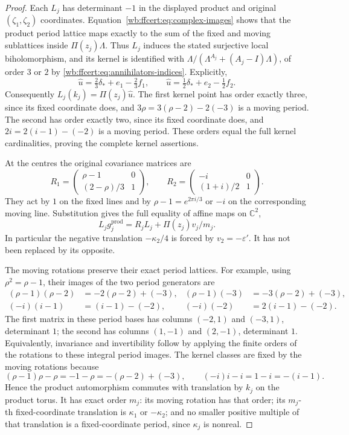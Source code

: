 \begin{proof}
Each $L_j$ has determinant $-1$ in the displayed product and original
$(\zeta_1,\zeta_2)$ coordinates. Equation~\eqref{wb:ffcert:eq:complex-images}
shows that the product period lattice maps exactly to the sum of the
fixed and moving sublattices inside $\Pi(z_j)\Lambda$.
Thus $L_j$ induces the stated surjective local biholomorphism, and its
kernel is identified with
$\Lambda/(\Lambda^{A_j}+(A_j-I)\Lambda)$, of order $3$ or $2$ by
\eqref{wb:ffcert:eq:annihilators-indices}. Explicitly,
\[
 \widehat u=\tfrac23\delta_*+e_1-\tfrac23f_1,
 \qquad
 \widehat u=\tfrac12\delta_*+e_2-\tfrac12f_2.
 \tag{FF17}\label{wb:ffcert:eq:kernel-lifts}
\]
Consequently $L_j(k_j)=\Pi(z_j)\widehat u$. The first kernel point
has order exactly three, since its fixed coordinate does, and
$3\rho=3(\rho-2)-2(-3)$ is a moving period. The second has order
exactly two, since its fixed coordinate does, and
$2i=2(i-1)-(-2)$ is a moving period. These orders equal the full kernel
cardinalities, proving the complete kernel assertions.

At the centres the original covariance matrices are
\[
 R_1=\begin{pmatrix}\rho-1&0\\(2-\rho)/3&1\end{pmatrix},\qquad
 R_2=\begin{pmatrix}-i&0\\(1+i)/2&1\end{pmatrix}.
 \tag{FF18}\label{wb:ffcert:eq:central-covariance}
\]
They act by $1$ on the fixed lines and by
$\rho-1=e^{2\pi i/3}$ or $-i$ on the corresponding moving line.
Substitution gives the full equality of affine maps on $\mathbb C^2$,
\[
 L_jg_j^{\mathrm{prod}}
   =R_jL_j+\Pi(z_j)v_j/m_j.
 \tag{FF19}\label{wb:ffcert:eq:product-intertwining}
\]
In particular the negative translation $-\kappa_2/4$ is forced by
$v_2=-\varepsilon'$. It has not been replaced by its opposite.

The moving rotations preserve their exact period lattices. For example,
using $\rho^2=\rho-1$, their images of the two period generators are
\[
\begin{aligned}
 (\rho-1)(\rho-2)&=-2(\rho-2)+(-3),&
 (\rho-1)(-3)&=-3(\rho-2)+(-3),\\
 (-i)(i-1)&=(i-1)-(-2),&
 (-i)(-2)&=2(i-1)-(-2).
\end{aligned}
\tag{FF20}\label{wb:ffcert:eq:moving-rotations}
\]
The first matrix in these period bases has columns $(-2,1)$ and
$(-3,1)$, determinant $1$; the second has columns $(1,-1)$ and
$(2,-1)$, determinant $1$.
Equivalently, invariance and invertibility follow by applying the finite
orders of the rotations to these integral period images.
The kernel classes are fixed by the moving rotations because
\[
 (\rho-1)\rho-\rho=-1-\rho=-(\rho-2)+(-3),\qquad
 (-i)i-i=1-i=-(i-1).
 \tag{FF21}\label{wb:ffcert:eq:kernel-rotation}
\]
Hence the product automorphism commutes with translation by $k_j$ on
the product torus. It has exact order $m_j$: its moving rotation has
that order; its $m_j$-th fixed-coordinate translation is
$\kappa_1$ or $-\kappa_2$; and no smaller positive multiple of that
translation is a fixed-coordinate period, since $\kappa_j$ is nonreal.


\end{proof}
